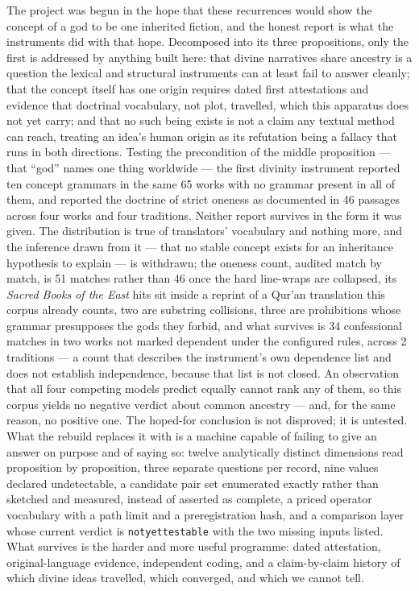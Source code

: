 \documentclass[11pt]{article}
\DeclareRobustCommand{\_}{\textunderscore\allowbreak}
\begin{document}
The project was begun in the hope that these recurrences would show the concept of
a god to be one inherited fiction, and the honest report is what the instruments
did with that hope. Decomposed into its three propositions, only the first is
addressed by anything built here: that divine narratives share ancestry is a
question the lexical and structural instruments can at least fail to answer
cleanly; that the concept itself has one origin requires dated first attestations
and evidence that doctrinal vocabulary, not plot, travelled, which this apparatus
does not yet carry; and that no such being exists is not a claim any textual method
can reach, treating an idea's human origin as its refutation being a fallacy that
runs in both directions. Testing the precondition of the middle proposition ---
that ``god'' names one thing worldwide --- the first divinity instrument reported
ten concept grammars in the same 65 works with no grammar present in all of them,
and reported the doctrine of strict oneness as documented in 46 passages across
four works and four traditions. Neither report survives in the form it was given.
The distribution is true of translators' vocabulary and nothing more, and the
inference drawn from it --- that no stable concept exists for an inheritance
hypothesis to explain --- is withdrawn; the oneness count, audited match by match,
is 51 matches rather than 46 once the hard line-wraps are collapsed, its
\emph{Sacred Books of the East} hits sit inside a reprint of a Qur'an translation
this corpus already counts, two are substring collisions, three are prohibitions
whose grammar presupposes the gods they forbid, and what survives is 34 confessional
matches in two works not marked dependent under the configured rules, across 2
traditions --- a count that describes the instrument's own dependence list and does
not establish independence, because that list is not closed. An observation
that all four competing models predict equally cannot rank any of them, so this
corpus yields no negative verdict about common ancestry --- and, for the same
reason, no positive one. The hoped-for conclusion is not disproved; it is
untested. What the rebuild replaces it with is a machine capable of failing to
give an answer on purpose and of saying so: twelve analytically distinct dimensions read
proposition by proposition, three separate questions per record, nine values
declared undetectable, a candidate pair set enumerated exactly rather than sketched
and measured, instead of asserted as complete, a priced operator vocabulary with a path limit and a preregistration
hash, and a comparison layer whose current verdict is \texttt{not\_yet\_testable}
with the two missing inputs listed. What survives is the harder and more useful
programme: dated attestation, original-language evidence, independent coding, and
a claim-by-claim history of which divine ideas travelled, which converged, and
which we cannot tell.
\end{document}
